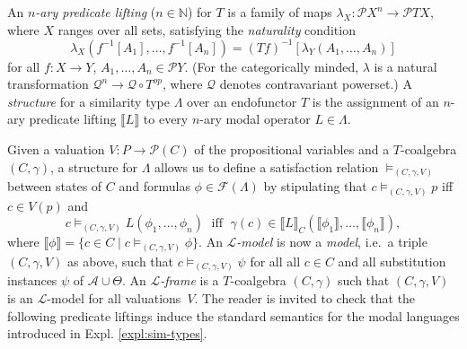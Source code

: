 \documentclass[proceedings]{stacs}
\theoremstyle{definition}
\theoremstyle{plain}
\newcommand{\Pow}{\mathcal{P}}
\newcommand{\Op}{{op}}
\newcommand{\Lang}{\mathcal{L}}
\newcommand{\FLang}{\mathcal{F}}
\newcommand{\Nat}{{\mathbb{N}}}
\newcommand{\contrapow}{\mathcal{Q}}
\newcommand{\Ax}{\mathcal{A}}
\newcommand{\AtProp}{P}
\newcommand{\Form}{\FLang}
\newcommand{\lsem}{\llbracket}
\newcommand{\rsem}{\rrbracket}
\begin{document}
\begin{defi}\label{def:lifting}\cite{Pattinson03}
  An \emph{$n$-ary predicate lifting} ($n\in\Nat$) for $T$
  is a family of maps $\lambda_X:\Pow{X}^n \to\Pow{TX}$, where $X$
  ranges over all sets, satisfying the \emph{naturality} condition
  \begin{equation*}
    \lambda_X(f^{-1}[A_1],\dots,f^{-1}[A_n])=(Tf)^{-1}[\lambda_Y(A_1,\dots,A_n)]
  \end{equation*}
  for all $f:X\to Y$, $A_1,\dots,A_n\in\Pow{Y}$. (For the
  categorically minded, $\lambda$ is a natural transformation
  $\contrapow^n\to\contrapow\circ T^\Op$, where $\contrapow$ denotes
  contravariant powerset.) A \emph{structure} for a similarity type
  $\Lambda$ over an endofunctor $T$ is the assignment of an $n$-ary
  predicate lifting $\lsem L \rsem$ to every $n$-ary modal operator $L
  \in \Lambda$.
\end{defi}\noindent
\noindent Given a valuation $V: \AtProp \to \Pow(C)$ of the
propositional variables and a $T$-coalgebra $(C, \gamma)$, a structure
for $\Lambda$ allows us to define a satisfaction relation
$\models_{(C, \gamma,V)}$ between states of $C$ and formulas $\phi \in
\Form(\Lambda)$ by stipulating that $c\models_{(C, \gamma,V)}p$ iff
$c\in V(p)$ and
\[
c\models_{(C, \gamma, V)} L (\phi_1, \dots, \phi_n)\;\textrm{ iff }\;
\gamma(c)\in \lsem L \rsem_C (\lsem \phi_1 \rsem,
\dots, \lsem \phi_n \rsem),
\]
where $\lsem \phi \rsem=\{c\in C\mid c\models_{(C, \gamma,V)}\phi\}$.
An \emph{$\Lang$-model} is now a \emph{model}, i.e.\ a triple $(C,
\gamma, V)$ as above, such that $c \models_{(C, \gamma,V)} \psi$ for
all all $c\in C$ and all substitution instances $\psi$ of $\Ax \cup
\Theta$.  An \emph{$\Lang$-frame} is a $T$-coalgebra $(C, \gamma)$ such that
$(C, \gamma, V)$ is an $\Lang$-model for all valuations~$V$.  The
reader is invited to check that the following predicate liftings
induce the standard semantics for the modal languages introduced in
Expl. \ref{expl:sim-types}.
\end{document}
